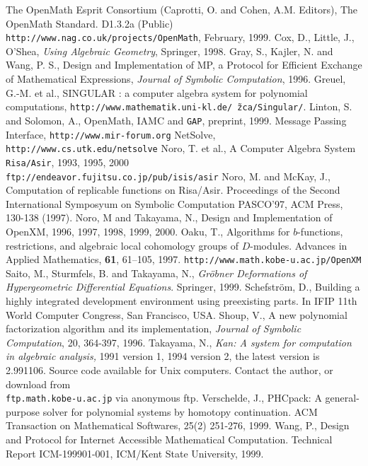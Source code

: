 
\begin{thebibliography}{X}
The OpenMath Esprit Consortium 
(Caprotti, O. and Cohen, A.M. Editors),
The OpenMath Standard. D1.3.2a (Public) \\
{\footnotesize \tt http://www.nag.co.uk/projects/OpenMath},
February, 1999.
Cox, D., Little, J.,  O'Shea,
{\it Using Algebraic Geometry}, Springer, 1998.
Gray, S., Kajler, N. and Wang, P. S.,
Design and Implementation of MP, a Protocol for Efficient
  Exchange of Mathematical Expressions,
{\sl Journal of Symbolic Computation}, 1996.
Greuel, G.-M. et al., SINGULAR : a computer algebra system for polynomial
computations, {\tt http://www.mathematik.uni-kl.de/\~\,zca/Singular/}.
Linton, S. and Solomon, A.,
OpenMath, IAMC and {\tt GAP},
preprint, 1999.
 Message Passing Interface,
{\tt http://www.mir-forum.org} 
NetSolve, {\tt http://www.cs.utk.edu/netsolve}
Noro, T. et al., 
A Computer Algebra System {\tt Risa/Asir},  1993, 1995, 2000\\
{\tt ftp://endeavor.fujitsu.co.jp/pub/isis/asir}
Noro, M. and McKay, J.,
Computation of replicable functions on Risa/Asir.
Proceedings of the Second International Symposyum on
Symbolic Computation PASCO'97, ACM Press, 130-138 (1997).
Noro, M and Takayama, N., Design and Implementation
of OpenXM, 1996, 1997, 1998, 1999, 2000.
Oaku, T.,
Algorithms for $b$-functions, restrictions, and algebraic local cohomology
groups of $D$-modules.
Advances in Applied Mathematics, {\bf 61}, 61--105, 1997.
{\footnotesize {\tt http://www.math.kobe-u.ac.jp/OpenXM}}
Saito, M., Sturmfels, B. and Takayama, N.,
{\it Gr\"obner Deformations of Hypergeometric Differential Equations}.
Springer, 1999.
Schefstr\"om, D.,
Building a highly integrated development environment using
preexisting parts.
In IFIP 11th World Computer Congress, San Francisco, USA.
Shoup, V., 
A new polynomial factorization algorithm and 
its implementation,
{\sl Journal of Symbolic Computation}, 20, 364-397, 1996.
	Takayama, N.,
	{\em Kan: A system for computation in
	algebraic analysis,} 1991 version 1,
        1994 version 2, the latest version is 2.991106.
	Source code available for Unix computers. 
         Contact the author, or download from \\
	{\tt \small ftp.math.kobe-u.ac.jp} via anonymous ftp.
Verschelde, J.,
PHCpack: A general-purpose solver for polynomial systems by
homotopy continuation.  ACM Transaction on Mathematical Softwares, 25(2) 
251-276, 1999.
Wang, P.,
Design and Protocol for Internet Accessible Mathematical Computation.
Technical Report ICM-199901-001, ICM/Kent State University, 1999.
\end{thebibliography}
